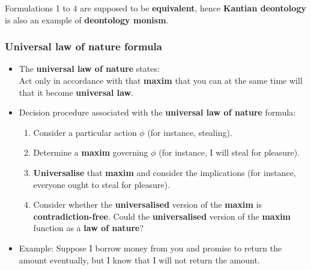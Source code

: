 \documentclass[11pt]{article}
\begin{document}
Formulations 1 to 4 are supposed to be \textbf{equivalent}, hence \textbf{Kantian deontology} is also an example of \textbf{deontology monism}.

 \newpage
\subsubsection{Universal law of nature formula}
\label{sec:org43af884}
\begin{itemize}
\item The \textbf{universal law of nature} states:  \\
Act only in accordance with that \textbf{maxim} that you can at the same time will that it become \textbf{universal law}.
\item Decision procedure associated with the \textbf{universal law of nature} formula:
\begin{enumerate}
\item Consider a particular action \(\phi\) (for instance, stealing).
\item Determine a \textbf{maxim} governing \(\phi\) (for instance, I will steal for pleasure).
\item \textbf{Universalise} that \textbf{maxim} and consider the implications (for instance, everyone ought to steal for pleasure).
\item Consider whether the \textbf{universalised} version of the \textbf{maxim} is \textbf{contradiction-free}. Could the \textbf{universalised} version of the \textbf{maxim} function as a \textbf{law of nature}?
\end{enumerate}
\item Example:
Suppose I borrow money from you and promise to return the amount eventually, but I know that I will not return the amount.
\end{itemize}

 \newpage
\end{document}

